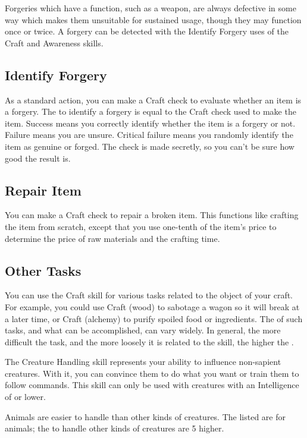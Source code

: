         Forgeries which have a function, such as a weapon, are always defective in some way which makes them unsuitable for sustained usage, though they may function once or twice.
        A forgery can be detected with the Identify Forgery uses of the Craft and Awareness skills.

    \subsection{Identify Forgery}
        As a standard action, you can make a Craft check to evaluate whether an item is a forgery. The  to identify a forgery is equal to the Craft check used to make the item. Success means you correctly identify whether the item is a forgery or not. Failure means you are unsure. Critical failure means you randomly identify the item as genuine or forged. The check is made secretly, so you can't be sure how good the result is.

    \subsection{Repair Item}
        You can make a Craft check to repair a broken item. This functions like crafting the item from scratch, except that you use one-tenth of the item's price to determine the price of raw materials and the crafting time.

    \subsection{Other Tasks}
        You can use the Craft skill for various tasks related to the object of your craft. For example, you could use Craft (wood) to sabotage a wagon so it will break at a later time, or Craft (alchemy) to purify spoiled food or ingredients. The  of such tasks, and what can be accomplished, can vary widely. In general, the more difficult the task, and the more loosely it is related to the skill, the higher the .

\newpage
{}
    The Creature Handling skill represents your ability to influence non-sapient creatures.
    With it, you can convince them to do what you want or train them to follow commands. This skill can only be used with creatures with an Intelligence of  or lower.

        Animals are easier to handle than other kinds of creatures.
        The  listed are for animals; the  to handle other kinds of creatures are 5 higher.

